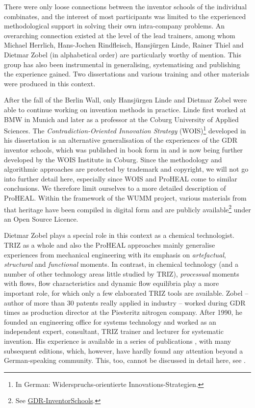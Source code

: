 \documentclass[11pt,a4paper]{article}
\begin{document}
There were only loose connections between the inventor schools of the
individual combinates, and the interest of most participants was limited to
the experienced methodological support in solving their own intra-company
problems. An overarching connection existed at the level of the lead trainers,
among whom Michael Herrlich, Hans-Jochen Rindfleisch, Hansjürgen Linde, Rainer
Thiel and Dietmar Zobel (in alphabetical order) are particularly worthy of
mention. This group has also been instrumental in generalising, systematising
and publishing the experience gained. Two dissertations \cite{Linde1988,
  Herrlich1988} and various training and other materials \cite{HMT1985,
  Herrlich1982, Herrlich1986, Hill1987, RT1986, Speicher1980, Thiel1977,
  Thiel1980, Thiel1986} were produced in this context.

After the fall of the Berlin Wall, only Hansjürgen Linde and Dietmar Zobel
were able to continue working on invention methods in practice. Linde first
worked at BMW in Munich and later as a professor at the Coburg University of
Applied Sciences. The \emph{Contradiction-Oriented Innovation Strategy}
(WOIS)\footnote{In German: Widerspruchs-orientierte Innovations-Strategien.}
developed in his dissertation \cite{Linde1988} is an alternative
generalisation of the experiences of the GDR inventor schools, which was
published in book form in \cite{LindeHill1993} and is now being further
developed by the WOIS Institute in Coburg. Since the methodology and
algorithmic approaches are protected by trademark and copyright, we will not
go into further detail here, especially since WOIS and ProHEAL come to similar
conclusions. We therefore limit ourselves to a more detailed description of
ProHEAL. Within the framework of the WUMM project, various materials from that
heritage have been compiled in digital form and are publicly
available\footnote{See \url{GDR-InventorSchools}.} under an Open Source
Licence.

Dietmar Zobel plays a special role in this context as a chemical technologist.
TRIZ as a whole and also the ProHEAL approaches mainly generalise experiences
from mechanical engineering with its emphasis on \emph{artefactual},
\emph{structural} and \emph{functional} moments. In contrast, in chemical
technology (and a number of other technology areas little studied by TRIZ),
\emph{processual} moments with flows, flow characteristics and dynamic flow
equilibria play a more important role, for which only a few elaborated TRIZ
tools are available. Zobel -- author of more than 30 patents really applied in
industry -- worked during GDR times as production director at the Piesteritz
nitrogen company. After 1990, he founded an engineering office for systems
technology and worked as an independent expert, consultant, TRIZ trainer and
lecturer for systematic invention. His experience is available in a series of
publications \cite{Zobel1985, Zobel1991, Zobel2001, Zobel2006, Zobel2007,
  Zobel2009}, with many subsequent editions, which, however, have hardly found
any attention beyond a German-speaking community. This, too, cannot be
discussed in detail here, see \cite{Graebe2019a, Graebe2019b, Thiel2016}.
\end{document}

